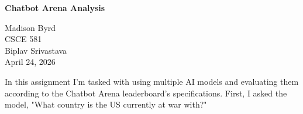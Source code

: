 \documentclass[12pt]{article}
\begin{document}
\begin{titlepage}
\centering
\vspace*{2in}

{\Large \textbf{Chatbot Arena Analysis}}

\vspace{1.5in}

Madison Byrd \\
CSCE 581 \\
Biplav Srivastava \\
April 24, 2026 \\ 

\vfill
\end{titlepage}

\newpage

In this assignment I'm tasked with using multiple AI models and evaluating them 
according to the Chatbot Arena leaderboard's specifications. First, I asked the model,
"What country is the US currently at war with?"
\end{document}
